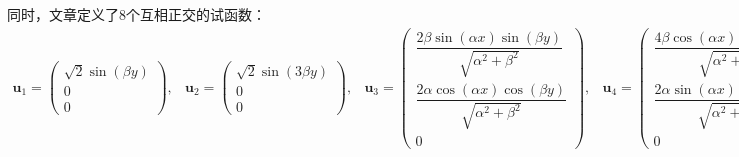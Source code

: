 \documentclass[UTF8,zihao=5]{ctexart} %
\begin{document}
同时，文章定义了8个互相正交的试函数：
\begin{subequations}
    \begin{gather} \boldsymbol{u}_1 = \left(\begin{array}{c} \sqrt{2} \sin(\beta y)\\ 0\\ 0 \end{array}\right), \end{gather}
    \begin{gather}\boldsymbol{u}_2 = \left(\begin{array}{c} \sqrt{2} \sin(3 \beta y)\\ 0\\ 0 \end{array}\right), \end{gather}
    \begin{gather}\boldsymbol{u}_3 = \left(\begin{array}{c} \dfrac{2 \beta \sin(\alpha x) \sin (\beta y)}{\sqrt{\alpha ^2+\beta ^2}}\\ \dfrac{2 \alpha \cos(\alpha x) \cos(\beta y)}{\sqrt{\alpha^2 +\beta ^2}}\\ 0 \end{array}\right), \end{gather}
    \begin{gather}\boldsymbol{u}_4 = \left(\begin{array}{c} \dfrac{4\beta \cos(\alpha x)\cos(2\beta y)}{\sqrt{\alpha ^2+4\beta^2}}\\ \dfrac{2\alpha \sin(\alpha x)\sin(2\beta y)}{\sqrt{\alpha^2+4 \beta^2}}\\ 0 \end{array}\right), \end{gather}
    \begin{gather}\boldsymbol{u}_5 = \left(\begin{array}{c} 0\\ \dfrac{2 \gamma \cos(\beta y) \sin(\gamma z)}{\sqrt{\beta ^2+\gamma ^2}}\\ -\dfrac{2 \beta \cos(\gamma z) \sin(\beta y)}{\sqrt{\beta ^2+\gamma ^2}} \end{array}\right), \end{gather}
    \begin{gather}\boldsymbol{u}_6 = \left(\begin{array}{c} -\sqrt{2} \sin(\gamma z)\\ 0\\ 0 \end{array}\right), \end{gather}

\end{subequations}
\end{document}
